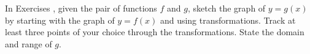 {\noindent In Exercises}
{, given the pair of functions $f$ and $g$, sketch the graph of $y=g(x)$ by starting with the graph of $y = f(x)$ and using transformations.  Track at least three points of your choice through the transformations. State the domain and range of $g$.}
